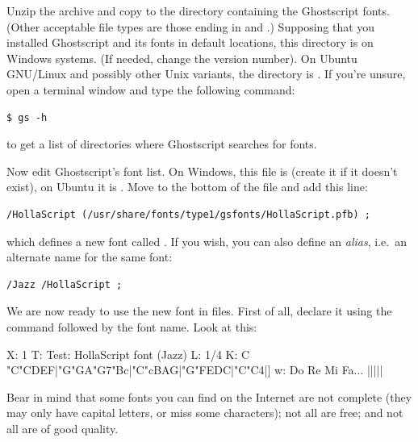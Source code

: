 \documentclass[a4paper,12pt]{book}
\begin{document}
Unzip the archive and copy  to the directory
containing the Ghostscript fonts. (Other acceptable file types are
those ending in  and .) Supposing that you
installed Ghostscript and its fonts in default locations, this
directory is  on Windows systems.
(If needed, change the version number). On Ubuntu GNU/Linux and
possibly other Unix variants, the directory is 
. If you're unsure, open a
terminal window and type the following command:

\begin{verbatim}
$ gs -h
\end{verbatim}

to get a list of directories where Ghostscript searches for fonts.

Now edit Ghostscript's font list. On Windows, this file is
 (create it if it doesn't
exist), on Ubuntu it is
. Move to the bottom of
the file and add this line:

\begin{verbatim}
/HollaScript (/usr/share/fonts/type1/gsfonts/HollaScript.pfb) ;
\end{verbatim}

which defines a new font called . If you wish, you
can also define an \emph{alias}, i.e.\ an alternate name for the same
font:

\begin{verbatim}
/Jazz /HollaScript ;
\end{verbatim}

We are now ready to use the new font in \ABC{} files. First of all,
declare it using the  command followed by the font name.
Look at this:

\begin{abcsource}
X: 1
T: Test: HollaScript font (Jazz)
L: 1/4
K: C
%
"C"CDEF|"G"GA"G7"Bc|"C"cBAG|"G"FEDC|"C"C4|]
w: Do Re Mi Fa... |||||
\end{abcsource}


Bear in mind that some fonts you can find on the Internet are not
complete (they may only have capital letters, or miss some
characters); not all are free; and not all are of good quality.
\end{document}
